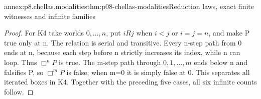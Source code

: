 \begin{annexitem}{annex:p8.chellas.modalities}{thm:p08-chellas-modalities}{Reduction laws, exact finite witnesses and infinite families}
\begin{proof}
For K4 take worlds \(0,\ldots,n\), put \(iRj\) when \(i<j\)
or \(i=j=n\), and make P true only at n. The relation is serial
and transitive. Every n-step path from 0 ends at n, because
each step before n strictly increases its index, while n can
loop. Thus \(\Box^n P\) is true. The m-step path through
\(0,1,\ldots,m\) ends below n and falsifies P, so
\(\Box^m P\) is false; when m=0 it is simply false at 0.
This separates all iterated boxes in K4. Together with the
preceding five cases, all six infinite counts follow.
\end{proof}
\end{annexitem}
